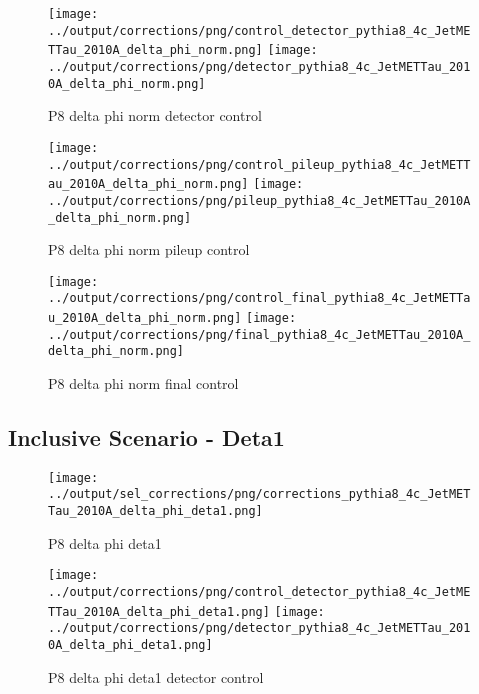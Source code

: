 \documentclass[11pt]{book}
\begin{document}
\begin{figure}[ht]
\centering
\texttt{[image: ../output/corrections/png/control\_detector\_pythia8\_4c\_JetMETTau\_2010A\_delta\_phi\_norm.png]}
\texttt{[image: ../output/corrections/png/detector\_pythia8\_4c\_JetMETTau\_2010A\_delta\_phi\_norm.png]}
\caption{P8 delta phi norm detector control}
\label{fig:p8_JetMETTau_2010A_delta_phi_norm_detector_control}
\end{figure}

\begin{figure}[ht]
\centering
\texttt{[image: ../output/corrections/png/control\_pileup\_pythia8\_4c\_JetMETTau\_2010A\_delta\_phi\_norm.png]}
\texttt{[image: ../output/corrections/png/pileup\_pythia8\_4c\_JetMETTau\_2010A\_delta\_phi\_norm.png]}
\caption{P8 delta phi norm pileup control}
\label{fig:p8_JetMETTau_2010A_delta_phi_norm_pileup_control}
\end{figure}


\begin{figure}[ht]
\centering
\texttt{[image: ../output/corrections/png/control\_final\_pythia8\_4c\_JetMETTau\_2010A\_delta\_phi\_norm.png]}
\texttt{[image: ../output/corrections/png/final\_pythia8\_4c\_JetMETTau\_2010A\_delta\_phi\_norm.png]}
\caption{P8 delta phi norm final control}
\label{fig:p8_JetMETTau_2010A_delta_phi_norm_final_control}
\end{figure}

\clearpage
\subsection{Inclusive Scenario - Deta1}

\begin{figure}[ht]
\centering
\texttt{[image: ../output/sel\_corrections/png/corrections\_pythia8\_4c\_JetMETTau\_2010A\_delta\_phi\_deta1.png]}
\caption{P8 delta phi deta1}
\label{fig:p8_JetMETTau_2010A_delta_phi_deta1}
\end{figure}


\begin{figure}[ht]
\centering
\texttt{[image: ../output/corrections/png/control\_detector\_pythia8\_4c\_JetMETTau\_2010A\_delta\_phi\_deta1.png]}
\texttt{[image: ../output/corrections/png/detector\_pythia8\_4c\_JetMETTau\_2010A\_delta\_phi\_deta1.png]}
\caption{P8 delta phi deta1 detector control}
\label{fig:p8_JetMETTau_2010A_delta_phi_deta1_detector_control}
\end{figure}
\end{document}
